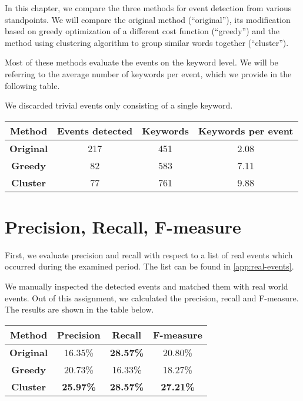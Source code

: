 In this chapter, we compare the three methods for event detection from various standpoints. We will compare the original method (``original''), its modification based on greedy optimization of a different cost function (``greedy'') and the method using clustering algorithm to group similar words together (``cluster'').

Most of these methods evaluate the events on the keyword level. We will be referring to the average number of keywords per event, which we provide in the following table.

We discarded trivial events only consisting of a single keyword.

\hspace{\fill}

\begin{minipage}{\linewidth}
\centering
\begin{tabular}{ c c c c }\toprule[1.5pt]
\bf Method 	 & \bf Events detected & \bf Keywords & \bf Keywords per event \\ \midrule
\bf Original & 217 & 451 & 2.08 \\
\bf Greedy   & 82 & 583 & 7.11 \\
\bf Cluster & 77 & 761 & 9.88 \\ \bottomrule[1.25pt]
\end {tabular}\par
{} \label{tab:title}
\end{minipage}

\hspace{\fill}

\section{Precision, Recall, F-measure}

First, we evaluate precision and recall with respect to a list of real events which occurred during the examined period. The list can be found in \autoref{app:real-events}.

We manually inspected the detected events and matched them with real world events. Out of this assignment, we calculated the precision, recall and F-measure. The results are shown in the table below.

\hspace{\fill}

\begin{minipage}{\linewidth}
\centering
\begin{tabular}{ c c c c }\toprule[1.5pt]
\bf Method 	 & \bf Precision & \bf Recall & \bf F-measure \\ \midrule
\bf Original &  16.35\%     & \bf 28.57\%     &  20.80\% \\
\bf Greedy   &  20.73\%     & 16.33\%      &  18.27\% \\
\bf Cluster &  \bf 25.97\%     & \bf 28.57\%      & \bf 27.21\% \\ \bottomrule[1.25pt]
\end {tabular}\par
{} \label{tab:title}
\end{minipage}

